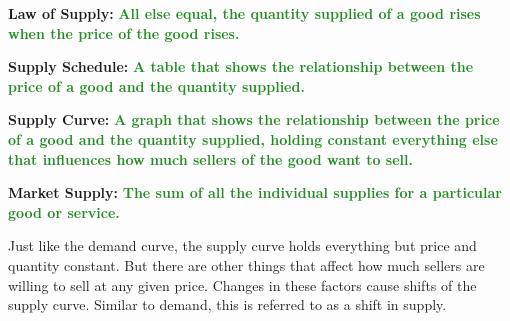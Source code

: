 \documentclass[11pt]{article}\usepackage[]{graphicx}\usepackage[]{color}
\theoremstyle{definition}
\newcommand{\ddp}[1]{{\textbf{\textcolor{ForestGreen}{#1}}}}
\newcommand{\defn}[1]{\textbf{#1}}
\begin{document}
	\defn{Law of Supply:} \ddp{All else equal, the quantity supplied of a good rises when the price of the good rises.\\}
	
	\defn{Supply Schedule:} \ddp{A table that shows the relationship between the price of a good and the quantity supplied.\\}
	
	\defn{Supply Curve:} \ddp{A graph that shows the relationship between the price of a good and the quantity supplied, holding constant everything else that influences how much sellers of the good want to sell.\\}
	
	\defn{Market Supply:} \ddp{The sum of all the individual supplies for a particular good or service.\\}
	
	Just like the demand curve, the supply curve holds everything but price and quantity constant. But there are other things that affect how much sellers are willing to sell at any given price. Changes in these factors cause shifts of the supply curve. Similar to demand, this is referred to as a shift in supply. 
	
\end{document}

